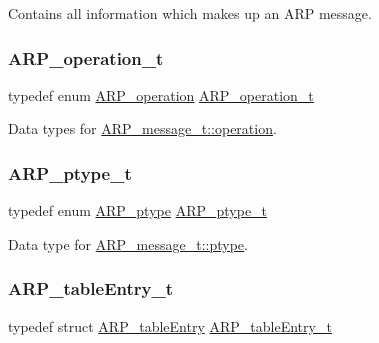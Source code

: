 Contains all information which makes up an A\+RP message. 

\mbox{\label{group__arp_ga3aca071e2781c5efead1609fcbb58ad3}} 
\subsubsection{\texorpdfstring{ARP\_operation\_t}{ARP\_operation\_t}}
{\footnotesize\ttfamily typedef enum \mbox{\hyperlink{group__arp_ga403f6527e9ff615efd0c8ed05790fde3}{A\+R\+P\+\_\+operation}}  \mbox{\hyperlink{group__arp_ga3aca071e2781c5efead1609fcbb58ad3}{A\+R\+P\+\_\+operation\+\_\+t}}}



Data types for \mbox{\hyperlink{struct_a_r_p__message_ad21c763fa2f80cb8649108b759113b54}{A\+R\+P\+\_\+message\+\_\+t\+::operation}}. 

\mbox{\label{group__arp_gab3358c917e9f326ba4187aed82248923}} 
\subsubsection{\texorpdfstring{ARP\_ptype\_t}{ARP\_ptype\_t}}
{\footnotesize\ttfamily typedef enum \mbox{\hyperlink{group__arp_gaeae5f5d6313cd707dd97fa24dbab569c}{A\+R\+P\+\_\+ptype}}  \mbox{\hyperlink{group__arp_gab3358c917e9f326ba4187aed82248923}{A\+R\+P\+\_\+ptype\+\_\+t}}}



Data type for \mbox{\hyperlink{struct_a_r_p__message_ab4891e9b77eb26f33d21cfde982564cb}{A\+R\+P\+\_\+message\+\_\+t\+::ptype}}. 

\mbox{\label{group__arp_gab5d4ef9cd020c5de772f55549aa70716}} 
\subsubsection{\texorpdfstring{ARP\_tableEntry\_t}{ARP\_tableEntry\_t}}
{\footnotesize\ttfamily typedef struct \mbox{\hyperlink{struct_a_r_p__table_entry}{A\+R\+P\+\_\+table\+Entry}}  \mbox{\hyperlink{group__arp_gab5d4ef9cd020c5de772f55549aa70716}{A\+R\+P\+\_\+table\+Entry\+\_\+t}}}



